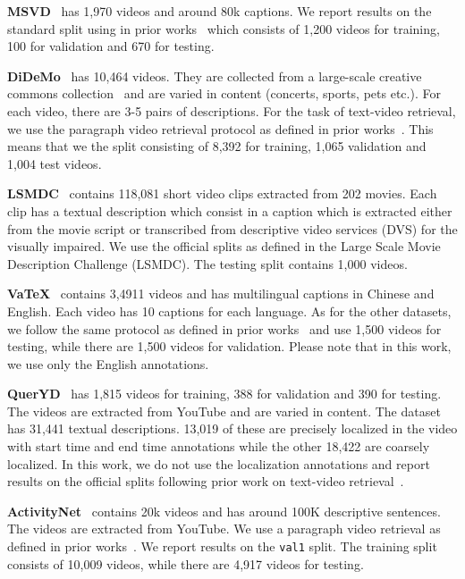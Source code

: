 \indent \textbf{MSVD}~\cite{chen2011collecting} has
1,970 videos and around 80k captions.
We report results on the standard split using in prior
works~\cite{venugopalan2015sequence,xu2015jointly,liu2019use,croitoru2021teachtext}
which consists of 1,200 videos for training, 100 for validation and 670 for testing. 

\indent \textbf{DiDeMo}~\cite{anne2017localizing} has 10,464 videos.
They are collected from a large-scale creative commons
collection~\cite{thomee2016yfcc100m} and are varied in content
(concerts, sports, pets etc.).
For each video, there are 3-5 pairs of descriptions.
For the task of text-video retrieval,
we use the paragraph video retrieval protocol as defined in
prior works~\cite{zhang2018cross,liu2019use,croitoru2021teachtext}.
This means that we the split consisting of 8,392 for training,
1,065 validation and 1,004 test videos.

\indent \textbf{LSMDC}~\cite{rohrbach2017movie}
contains 118,081 short video clips extracted from 202 movies.
Each clip has a textual description which consist in a caption
which is extracted either from the movie script or transcribed
from descriptive video services (DVS) for the visually impaired.
We use the official splits as defined in the Large Scale Movie
Description Challenge (LSMDC). The testing split contains 1,000 videos.

\indent \textbf{VaTeX}~\cite{wang2019vatex} contains 3,4911 videos and
has multilingual captions in Chinese and English.
Each video has 10 captions for each language.
As for the other datasets, we follow the same protocol as defined
in prior works~\cite{chen2020fine,patrick2020support,croitoru2021teachtext}
and use 1,500 videos for testing, while there are 1,500 videos for validation.
Please note that in this work, we use only the English annotations.

\indent \textbf{QuerYD}~\cite{oncescu20queryd} has 1,815 videos for training,
388 for validation and 390 for testing.
The videos are extracted from YouTube and are varied in content.
The dataset has 31,441 textual descriptions.
13,019 of these are precisely localized in the video with start time and end
time annotations while the other 18,422 are coarsely localized.
In this work, we do not use the localization annotations and report results
on the official splits following prior work on
text-video retrieval~\cite{croitoru2021teachtext}.

\indent \textbf{ActivityNet}~\cite{caba2015activitynet} contains
20k videos and has around 100K descriptive sentences.
The videos are extracted from YouTube.
We use a paragraph video retrieval as defined in
prior works~\cite{zhang2018cross, liu2019use, croitoru2021teachtext}.
We report results on the \texttt{val1} split.
The training split consists of 10,009 videos, while there are 4,917
videos for testing.

